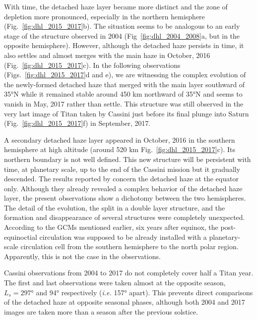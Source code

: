 With time, the detached haze layer became more distinct and the zone of depletion more pronounced, especially in the
northern hemisphere (Fig.~\ref{fig:dhl_2015_2017}b). The situation seems to be analogous to an early stage of
the structure observed in 2004 (Fig~\ref{fig:dhl_2004_2008}a, but in the opposite hemisphere).
However, although the detached haze persists in time,
it also settles and almost merges with the main haze in October, 2016 (Fig.~\ref{fig:dhl_2015_2017}c).
In the  following observations (Figs.~\ref{fig:dhl_2015_2017}d and e), we are
witnessing the complex evolution of the newly-formed detached haze that merged with the main layer southward
of \ang{35}N while it remained stable around 450 km northward of \ang{35}N and seems to vanish in May, 2017 rather than settle.
This structure was still observed in the very last image of Titan taken by Cassini just before its final plunge into Saturn
 (Fig.~\ref{fig:dhl_2015_2017}f) in September, 2017.

A secondary detached haze layer appeared in October, 2016 in the southern hemisphere at high altitude (around 520 km  Fig.~\ref{fig:dhl_2015_2017}c). Its northern boundary is not well defined. This new structure will be persistent with
time, at planetary scale, up to the end of the Cassini mission but it gradually descended. The results reported by \cite{West2018}
concern the detached haze at the equator only. Although they already revealed a complex behavior of the detached haze layer, the
present observations show a dichotomy between the two hemispheres. The detail of the evolution, the split in a double layer
structure, and the formation and disappearance of several structures were completely unexpected. According to the GCMs mentioned earlier, six years
after equinox, the post-equinoctial circulation was supposed to be already installed with a planetary-scale circulation cell
from the southern hemisphere to the north polar region. Apparently, this is not the case in the observations.

Cassini observations from 2004 to 2017 do not completely cover half a Titan year. The first and last observations
were taken almost at the opposite season, $L_s=\ang{297}$ and \ang{94} respectively (\emph{i.e.} \ang{157} apart).
This prevents direct comparisons of the detached haze at opposite seasonal phases,
although both 2004 and 2017 images are taken more than a season after the previous solstice.
